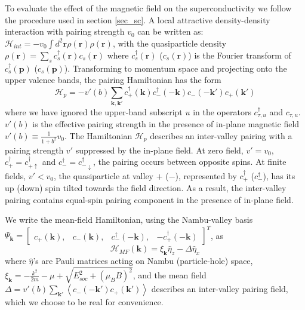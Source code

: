 To evaluate the effect of the magnetic field on the superconductivity we follow the procedure used in section  \ref{sec_sc}. A local attractive density-density
interaction with pairing strength $v_{0}$ can be written as: $\mathcal{H}_{int}=-v_{0}\int d^{2}\mathbf{r}\rho(\mathbf{r})\rho(\mathbf{r})$,
with the quasiparticle density $\rho(\mathbf{r})=\sum_{s}c_{s}^{\dagger}(\mathbf{r})c_{s}(\mathbf{r})$
where $c_{s}^{\dagger}(\mathbf{r})$ ($c_{s}(\mathbf{r})$) is the
Fourier transform of $c_{s}^{\dagger}(\mathbf{p})$ ($c_{s}(\mathbf{p})$).
Transforming to momentum space and projecting onto the upper valence
bands, the pairing Hamiltonian has the form
\begin{equation}
\mathcal{H}_{p}=-v'(b)\sum_{\mathbf{k},\mathbf{k}'}c_{+}^{\dagger}(\mathbf{k})c_{-}^{\dagger}(-\mathbf{k})c_{-}(-\mathbf{k}')c_{+}(\mathbf{k}')\label{eq: pairing_Hamiltonian}
\end{equation}
where we have ignored the upper-band subscript $u$ in the operators
$c_{\tau,u}^{\dagger}$ and $c_{\tau,u}$. $v'(b)$ is the effective
pairing strength in the presence of in-plane magnetic field $v'(b)\equiv\frac{1}{1+b^{2}}v_{0}$.
The Hamiltonian $\mathcal{H}_{p}$ describes an inter-valley pairing
with a pairing strength $v'$ suppressed by the in-plane field. At
zero field, $v'=v_{0}$, $c_{+}^{\dagger}=c_{+\uparrow}^{\dagger}$ and
$c_{-}^{\dagger}=c_{-\downarrow}^{\dagger}$, the pairing occurs between
opposite spins. At finite fields, $v'<v_{0}$, the quasiparticle at valley
$+$ ($-$), represented by $c_{+}^{\dagger}$ ($c_{-}^{\dagger}$),
has its up (down) spin tilted towards the field direction. As a result,
the inter-valley pairing contains equal-spin pairing component in
the presence of in-plane field.

We write the mean-field Hamiltonian, using the Nambu-valley basis
$\Psi_{\mathbf{k}}=\left[\begin{array}{cccc}
c_{+}(\mathbf{k}), & c_{-}(\mathbf{k}), & c_{-}^{\dagger}(-\mathbf{k}), & -c_{+}^{\dagger}(-\mathbf{k})\end{array}\right]^{T}$, as
\begin{equation}
\mathcal{H}_{MF}(\mathbf{k})=\xi_{\mathbf{k}}\hat{\eta}_{z}-\Delta\hat{\eta}_{x}\label{eq: Mean_Field_Hamiltonian}
\end{equation}
where $\hat{\eta}$'s are Pauli matrices acting on Nambu (particle-hole)
space, $\xi_{\mathbf{k}}=-\frac{k^{2}}{2m}-\mu+\sqrt{E_{soc}^{2}+\left(\mu_{B}B\right)^{2}}$,
and the mean field $\Delta=v'(b)\sum_{\mathbf{k}'}\left\langle c_{-}(-\mathbf{k}')c_{+}(\mathbf{k}')\right\rangle $
describes an inter-valley pairing field, which we choose to be real
for convenience.

